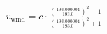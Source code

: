 \documentclass[preview]{standalone}
\begin{document}
\begin{align*}
v_{\text{wind}} = c \cdot \frac{\left(\frac{193.000004}{193.0}\right)^{2} - 1}{\left(\frac{193.000004}{193.0}\right)^{2} + 1}
\end{align*}
\end{document}
